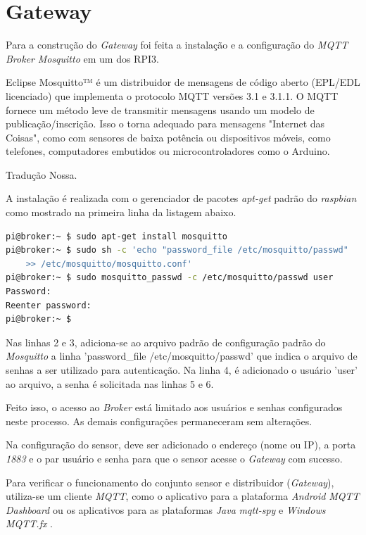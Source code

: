 \section{Gateway}
\label{sec:app-gw}

Para a construção do \emph{Gateway} foi feita a instalação e a configuração do
\emph{MQTT Broker} \emph{Mosquitto} em um dos RPI3.

\begin{citacao}

	Eclipse Mosquitto™ é um distribuidor de mensagens de código aberto (EPL/EDL
	licenciado) que implementa o protocolo MQTT versões 3.1 e 3.1.1. O MQTT
	fornece um método leve de transmitir mensagens usando um modelo de
	publicação/inscrição. Isso o torna adequado para mensagens "Internet das
	Coisas", como com sensores de baixa potência ou dispositivos móveis, como
	telefones, computadores embutidos ou microcontroladores como o Arduino. \

	 Tradução Nossa.
\end{citacao}


A instalação é realizada com o gerenciador de pacotes \emph{apt-get} padrão do
\emph{raspbian} como mostrado na primeira linha da listagem abaixo.

\begin{lstlisting}[language=bash,caption={Instalação e configuração do Mosquitto},label=code-mosquitto]
pi@broker:~ $ sudo apt-get install mosquitto
pi@broker:~ $ sudo sh -c 'echo "password_file /etc/mosquitto/passwd"
	>> /etc/mosquitto/mosquitto.conf'
pi@broker:~ $ sudo mosquitto_passwd -c /etc/mosquitto/passwd user
Password:
Reenter password:
pi@broker:~ $
\end{lstlisting}

Nas linhas 2 e 3, adiciona-se ao arquivo padrão de configuração padrão do
\emph{Mosquitto} a linha 'password\_file /etc/mosquitto/passwd' que
indica o arquivo de senhas a ser utilizado para autenticação. Na linha 4, é
adicionado o usuário 'user' ao arquivo, a senha é solicitada  nas
linhas 5 e 6.

Feito isso, o acesso ao \emph{Broker} está limitado aos usuários e senhas
configurados neste processo. As demais configurações permaneceram sem alterações.

Na configuração do sensor, deve ser adicionado o endereço (nome ou IP), a porta
\emph{1883} e o par usuário e senha para que o sensor acesse o \emph{Gateway} com
sucesso.

Para verificar o funcionamento do conjunto sensor e distribuidor (\emph{Gateway}), utiliza-se um
cliente \emph{MQTT}, como o aplicativo para a plataforma \emph{Android} \emph{MQTT Dashboard}
\cite{mqttdash} ou os aplicativos para as plataformas \emph{Java} \emph{mqtt-spy}
\cite{mqttspy} e \emph{Windows} \emph{MQTT.fx} \cite{mqttfx}.

